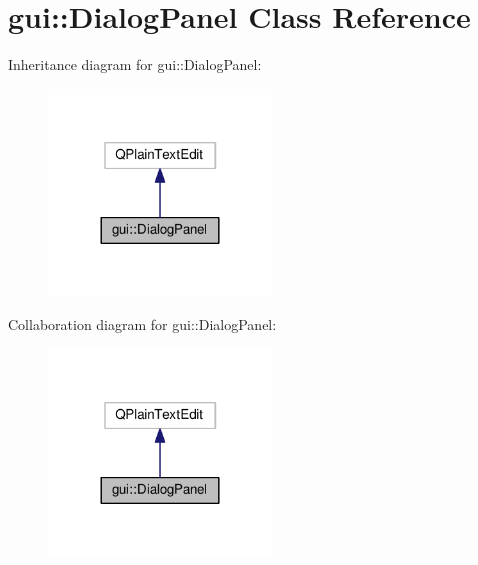 \hypertarget{classgui_1_1DialogPanel}{}\section{gui\+:\+:Dialog\+Panel Class Reference}
\label{classgui_1_1DialogPanel}


Inheritance diagram for gui\+:\+:Dialog\+Panel\+:\nopagebreak
\begin{figure}[H]
\begin{center}
\leavevmode
\includegraphics[width=168pt]{classgui_1_1DialogPanel__inherit__graph}
\end{center}
\end{figure}


Collaboration diagram for gui\+:\+:Dialog\+Panel\+:\nopagebreak
\begin{figure}[H]
\begin{center}
\leavevmode
\includegraphics[width=168pt]{classgui_1_1DialogPanel__coll__graph}
\end{center}
\end{figure}
